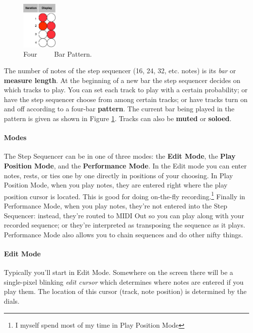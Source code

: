 \documentclass{article}
\begin{document}
\vspace{10in}

\begin{figure}
\hspace{\fill}\includegraphics[width=0.7in]{Patterns}\hspace{\fill}%
\vspace{-1em}
\caption{\small Four\ \ \ \ \ Bar Pattern.}\vspace{-1em}
\label{bars}
\end{figure}

The number of notes of the step sequencer (16, 24, 32, etc. notes) is its {\it bar} or {\bf measure length}.  At the beginning of a new bar the step sequencer decides on which tracks to play.  You can set each track to play with a certain probability; or have the step sequencer choose from among certain tracks; or have tracks turn on and off according to a four-bar {\bf pattern}.  The current bar being played in the pattern is given as shown in Figure \ref{bars}.  Tracks can also be {\bf muted} or {\bf soloed}.

\paragraph{Modes} The Step Sequencer can be in one of three modes: the {\bf Edit Mode}, the {\bf Play Position Mode}, and the {\bf Performance Mode}.  In the Edit mode you can enter notes, rests, or ties one by one directly in positions of your choosing.  In Play Position Mode, when you play notes, they are entered right where the play position cursor is located.  This is good for doing on-the-fly recording.\footnote{I myself spend most of my time in Play Position Mode}  Finally in Performance Mode, when you play notes, they're not entered into the Step Sequencer: instead, they're routed to MIDI Out so you can play along with your recorded sequence; or they're interpreted as transposing the sequence as it plays.  Performance Mode also allows you to chain sequences and do other nifty things.

\paragraph{Edit Mode}
Typically you'll start in Edit Mode.  Somewhere on the screen there will be a single-pixel blinking {\it edit cursor} which determines where notes are entered if you play them.  The location of this cursor (track, note position) is determined by the dials.  
\end{document}
